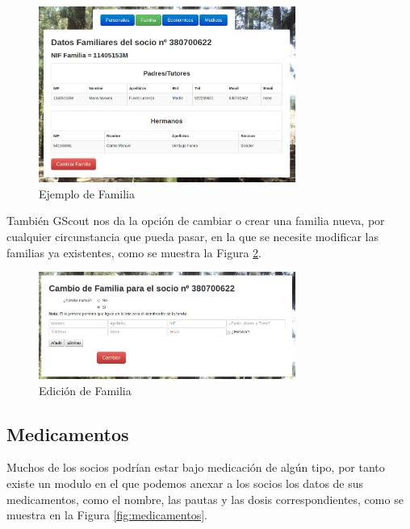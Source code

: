 \begin{figure}[H]
\begin{center}
\includegraphics[width=0.75\textwidth]{images/familia_socio.jpg}
\caption{Ejemplo de Familia}
\label{fig:familia}
\end{center}
\end{figure}

También GScout nos da la opción de cambiar o crear una familia nueva, por cualquier circunstancia que pueda pasar, en la que se necesite modificar las familias ya existentes, como se muestra la Figura \ref{fig:edit_familia}.\\

\begin{figure}[H]
\begin{center}
\includegraphics[width=0.75\textwidth]{images/cambio_familia.jpg}
\caption{Edición de Familia}
\label{fig:edit_familia}
\end{center}
\end{figure}


\subsection{Medicamentos}

Muchos de los socios podrían estar bajo medicación de algún tipo, por tanto existe un modulo en el que podemos anexar a los socios los datos de sus medicamentos, como el nombre, las pautas y las dosis correspondientes, 
como se muestra en la Figura \ref{fig:medicamentos}.\\

